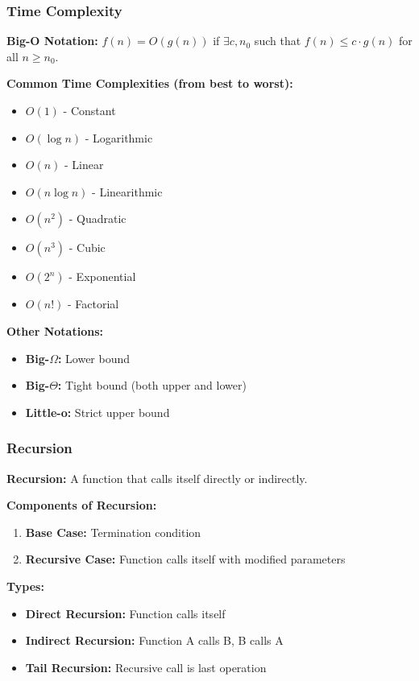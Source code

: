 \documentclass[11pt,a4paper]{article}
\begin{document}
\subsubsection{Time Complexity}

\begin{defbox}
\textbf{Big-O Notation:} $f(n) = O(g(n))$ if $\exists c, n_0$ such that $f(n) \leq c \cdot g(n)$ for all $n \geq n_0$.
\end{defbox}

\textbf{Common Time Complexities (from best to worst):}
\begin{itemize}
    \item $O(1)$ - Constant
    \item $O(\log n)$ - Logarithmic
    \item $O(n)$ - Linear
    \item $O(n \log n)$ - Linearithmic
    \item $O(n^2)$ - Quadratic
    \item $O(n^3)$ - Cubic
    \item $O(2^n)$ - Exponential
    \item $O(n!)$ - Factorial
\end{itemize}

\textbf{Other Notations:}
\begin{itemize}
    \item \textbf{Big-$\Omega$:} Lower bound
    \item \textbf{Big-$\Theta$:} Tight bound (both upper and lower)
    \item \textbf{Little-o:} Strict upper bound
\end{itemize}

\subsubsection{Recursion}

\begin{defbox}
\textbf{Recursion:} A function that calls itself directly or indirectly.
\end{defbox}

\textbf{Components of Recursion:}
\begin{enumerate}
    \item \textbf{Base Case:} Termination condition
    \item \textbf{Recursive Case:} Function calls itself with modified parameters
\end{enumerate}

\textbf{Types:}
\begin{itemize}
    \item \textbf{Direct Recursion:} Function calls itself
    \item \textbf{Indirect Recursion:} Function A calls B, B calls A
    \item \textbf{Tail Recursion:} Recursive call is last operation
\end{itemize}
\end{document}
